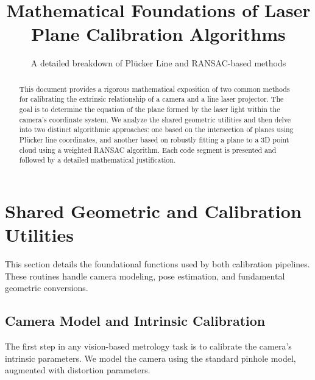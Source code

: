 \documentclass{article}
\title{Mathematical Foundations of Laser Plane Calibration Algorithms}
\author{A detailed breakdown of Pl\"ucker Line and RANSAC-based methods}
\date{}
\begin{document}
\maketitle

\begin{abstract}
This document provides a rigorous mathematical exposition of two common methods for calibrating the extrinsic relationship of a camera and a line laser projector. The goal is to determine the equation of the plane formed by the laser light within the camera's coordinate system. We analyze the shared geometric utilities and then delve into two distinct algorithmic approaches: one based on the intersection of planes using Pl\"ucker line coordinates, and another based on robustly fitting a plane to a 3D point cloud using a weighted RANSAC algorithm. Each code segment is presented and followed by a detailed mathematical justification.
\end{abstract}

\section{Shared Geometric and Calibration Utilities}
This section details the foundational functions used by both calibration pipelines. These routines handle camera modeling, pose estimation, and fundamental geometric conversions.

\subsection{Camera Model and Intrinsic Calibration}
The first step in any vision-based metrology task is to calibrate the camera's intrinsic parameters. We model the camera using the standard pinhole model, augmented with distortion parameters.
\end{document}

